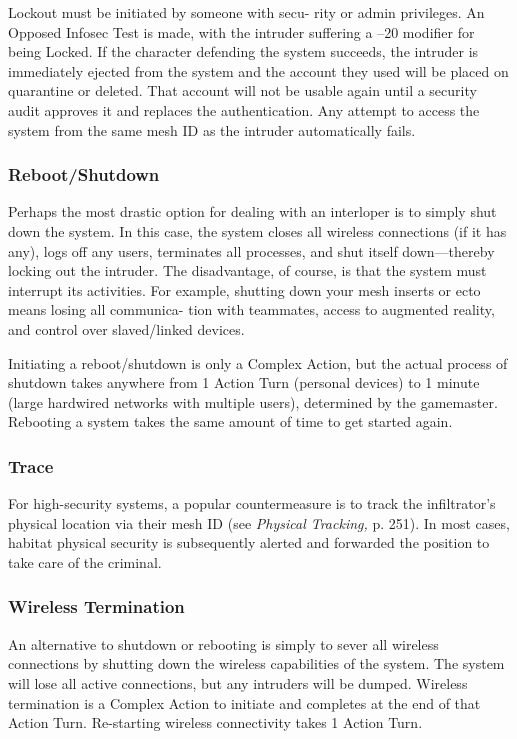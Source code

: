 Lockout must be initiated by someone with secu-
rity or admin privileges. An Opposed Infosec Test is 
made, with the intruder suffering a –20 modifier for 
being Locked. If the character defending the system 
succeeds, the intruder is immediately ejected from 
the system and the account they used will be placed 
on quarantine or deleted. That account will not be 
usable again until a security audit approves it and 
replaces the authentication. Any attempt to access 
the system from the same mesh ID as the intruder 
automatically fails.

\subsubsection{Reboot/Shutdown}

Perhaps the most drastic option for dealing with an 
interloper is to simply shut down the system. In this 
case, the system closes all wireless connections (if it 
has any), logs off any users, terminates all processes, 
and shut itself down—thereby locking out the intruder. 
The disadvantage, of course, is that the system must 
interrupt its activities. For example, shutting down 
your mesh inserts or ecto means losing all communica-
tion with teammates, access to augmented reality, and 
control over slaved/linked devices.

Initiating a reboot/shutdown is only a Complex 
Action, but the actual process of shutdown takes 
anywhere from 1 Action Turn (personal devices) to 1 
minute (large hardwired networks with multiple users), 
determined by the gamemaster. Rebooting a system 
takes the same amount of time to get started again.

\subsubsection{Trace}

For high-security systems, a popular countermeasure 
is to track the infiltrator's physical location via their 
mesh ID (see \textit{Physical Tracking,} p. 251). In most cases, 
habitat physical security is subsequently alerted and 
forwarded the position to take care of the criminal.

\subsubsection{Wireless Termination}

An alternative to shutdown or rebooting is simply to 
sever all wireless connections by shutting down the 
wireless capabilities of the system. The system will 
lose all active connections, but any intruders will be 
dumped. Wireless termination is a Complex Action to 
initiate and completes at the end of that Action Turn. 
Re-starting wireless connectivity takes 1 Action Turn.

